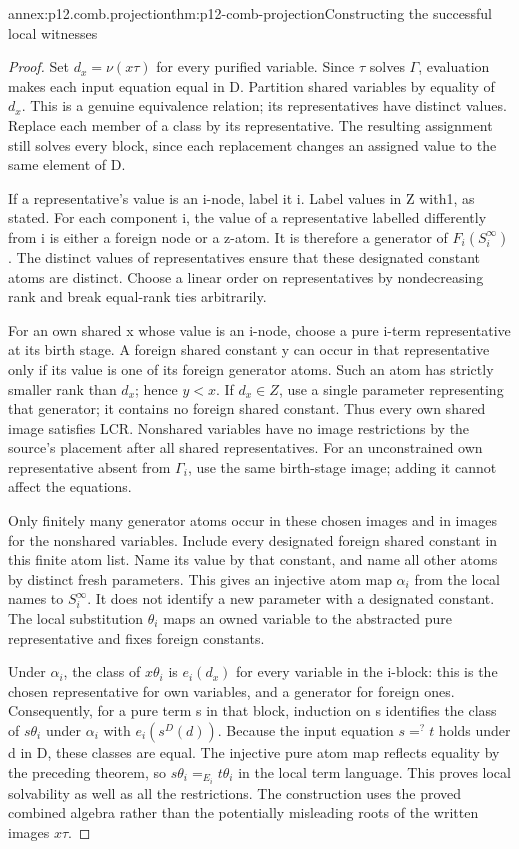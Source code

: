 \begin{annexitem}{annex:p12.comb.projection}{thm:p12-comb-projection}{Constructing the successful local witnesses}
\begin{proof}
Set \(d_x=\nu(x\tau)\) for every purified variable. Since \(\tau\)
solves \(\Gamma\), evaluation makes each input equation equal in D.
Partition shared variables by equality of \(d_x\). This is a
genuine equivalence relation; its representatives have distinct
values. Replace each member of a class by its representative.
The resulting assignment still solves every block, since each
replacement changes an assigned value to the same element of D.

If a representative's value is an i-node, label it i. Label values
in Z with1, as stated. For each component i, the value of a
representative labelled differently from i is either a foreign node
or a z-atom. It is therefore a generator of \(F_i(S_i^\infty)\).
The distinct values of representatives ensure that these designated
constant atoms are distinct. Choose a linear order on representatives
by nondecreasing rank and break equal-rank ties arbitrarily.

For an own shared x whose value is an i-node, choose a pure i-term
representative at its birth stage. A foreign shared constant y can
occur in that representative only if its value is one of its
foreign generator atoms. Such an atom has strictly smaller rank
than \(d_x\); hence \(y<x\). If \(d_x\in Z\), use a single
parameter representing that generator; it contains no foreign
shared constant. Thus every own shared image satisfies LCR.
Nonshared variables have no image restrictions by the source's
placement after all shared representatives. For an unconstrained
own representative absent from \(\Gamma_i\), use the same birth-stage
image; adding it cannot affect the equations.

Only finitely many generator atoms occur in these chosen images
and in images for the nonshared variables. Include every designated
foreign shared constant in this finite atom list. Name its value by
that constant, and name all other atoms by distinct fresh parameters.
This gives an injective atom map \(\alpha_i\) from the local names
to \(S_i^\infty\). It does not identify a new parameter with a
designated constant. The local substitution \(\theta_i\) maps an
owned variable to the abstracted pure representative and fixes
foreign constants.

Under \(\alpha_i\), the class of \(x\theta_i\) is
\(e_i(d_x)\) for every variable in the i-block: this is the chosen
representative for own variables, and a generator for foreign ones.
Consequently, for a pure term s in that block, induction on s
identifies the class of \(s\theta_i\) under \(\alpha_i\) with
\(e_i(s^D(d))\). Because the input equation \(s=^{?}t\) holds
under d in D, these classes are equal. The injective pure atom
map reflects equality by the preceding theorem, so
\(s\theta_i=_{E_i}t\theta_i\) in the local term language.
This proves local solvability as well as all the restrictions.
The construction uses the proved combined algebra rather than
the potentially misleading roots of the written images \(x\tau\).
\end{proof}
\end{annexitem}

